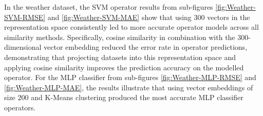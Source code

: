 In the weather dataset, the SVM operator results from sub-figures \ref{fig:Weather-SVM-RMSE} and \ref{fig:Weather-SVM-MAE} show that using $300$ vectors in the representation space consistently led to more accurate operator models across all similarity methods. Specifically, cosine similarity in combination with the $300$-dimensional vector embedding reduced the error rate in operator predictions, demonstrating that projecting datasets into this representation space and applying cosine similarity improves the prediction accuracy on the modelled operator. For the MLP classifier from sub-figures \ref{fig:Weather-MLP-RMSE} and \ref{fig:Weather-MLP-MAE}, the results illustrate that using vector embeddings of size $200$ and K-Means clustering produced the most accurate MLP classifier operators.




